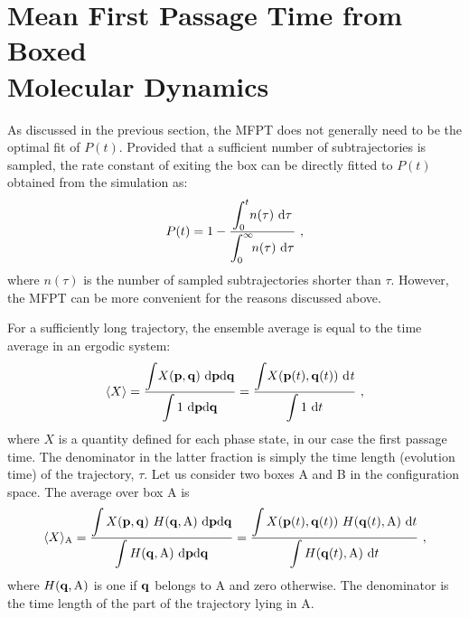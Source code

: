 \section[Mean First Passage Time from Boxed Molecular Dynamics]{Mean First Passage Time from Boxed \\ Molecular Dynamics}

As discussed in the previous section, the MFPT does not generally need to be the optimal fit of $P(t)$.
Provided that a sufficient number of subtrajectories is sampled, the rate constant of exiting the box can be directly fitted to $P(t)$ obtained from the simulation as:
\begin{equation}
\label{eq:pt-exp}
P(t) = 1 - \frac{\displaystyle \int_0^{t} \! n(\tau) ~ {\rm d} \tau}{\displaystyle \int_0^{\infty} \!\! n(\tau) ~ {\rm d} \tau} ~,
\end{equation}
where $n(\tau)$ is the number of sampled subtrajectories shorter than $\tau$. 
However, the MFPT can be more convenient for the reasons discussed above.

For a sufficiently long trajectory, the ensemble average is equal to the time average in an ergodic system:
\begin{equation}
\label{eq:erg}
\langle X \rangle 
= \frac{\displaystyle{\int \! X({\bf p} ,{\bf q}) ~ {\rm d} {\bf p} {\rm d} {\bf q}}}{\displaystyle{\int 1 ~ {\rm d} {\bf p} {\rm d} {\bf q}}}
= \frac{\displaystyle{\int \! X({\bf p}(t),{\bf q}(t)) ~ {\rm d} \it t}}{\displaystyle{\int 1 ~ {\rm d} t}} ~,
\end{equation}
where $X$ is a quantity defined for each phase state, in our case the first passage time.
The denominator in the latter fraction is simply the time length (evolution time) of the trajectory, $\tau$.
Let us consider two boxes A and B in the configuration space.
The average over box A is
\begin{equation}
\label{eq:ergbox}
\langle X \rangle_{\rm A}
= \frac{\displaystyle{\int X({\bf p},{\bf q}) ~ H ({\bf q}, {\rm A}) ~ {\rm d} {\bf p} {\rm d} {\bf q}}}
{\displaystyle{\int  H ({\bf q}, {\rm A}) ~ {\rm d} {\bf p} {\rm d} {\bf q}}}
= \frac{\displaystyle{\int X({\bf p}(t),{\bf q}(t)) ~ H ({\bf q}(t), {\rm A}) ~ {\rm d} t}}
{\displaystyle{\int H ({\bf q}(t), {\rm A}) ~ {\rm d} t}} ~,
\end{equation}
where $H({\bf q}\rm,A)$ is one if ${\bf q}\rm$ belongs to A and zero otherwise.
The denominator is the time length of the part of the trajectory lying in A.

